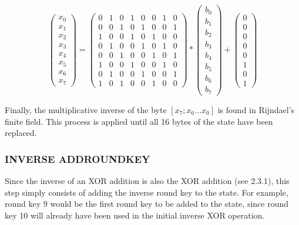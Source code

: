 \documentclass[12pt]{report}
\theoremstyle{definition}
\theoremstyle{remark}
\begin{document}
\[ 
\left( \begin{array}{c}
x_0 \\
x_1 \\
x_2 \\
x_3 \\
x_4 \\
x_5 \\
x_6 \\
x_7\end{array} \right)
=
\left( \begin{array}{cccccccc}
0 & 1 & 0 & 1 & 0 & 0 & 1 & 0 \\
0 & 0 & 1 & 0 & 1 & 0 & 0 & 1 \\
1 & 0 & 0 & 1 & 0 & 1 & 0 & 0 \\
0 & 1 & 0 & 0 & 1 & 0 & 1 & 0 \\
0 & 0 & 1 & 0 & 0 & 1 & 0 & 1 \\
1 & 0 & 0 & 1 & 0 & 0 & 1 & 0 \\
0 & 1 & 0 & 0 & 1 & 0 & 0 & 1 \\
1 & 0 & 1 & 0 & 0 & 1 & 0 & 0\end{array} \right)
*
\left( \begin{array}{c}
b_0 \\
b_1 \\
b_2 \\
b_3 \\
b_4 \\
b_5 \\
b_6 \\
b_7\end{array} \right)
+
\left( \begin{array}{c}
0 \\
0 \\
0 \\
0 \\
0 \\
1 \\
0 \\
1\end{array} \right)
\]

Finally, the multiplicative inverse of the byte $[x_7;x_6...x_0]$ is found in Rijndael's finite field. This process is applied until all 16 bytes of the state have been replaced.

\subsubsection{INVERSE ADDROUNDKEY}
Since the inverse of an XOR addition is also the XOR addition (see 2.3.1), this step simply consists of adding the inverse round key to the state. For example, round key 9 would be the first round key to be added to the state, since round key 10 will already have been used in the initial inverse XOR operation\cite{RoundKeyInverse}.
\end{document}
